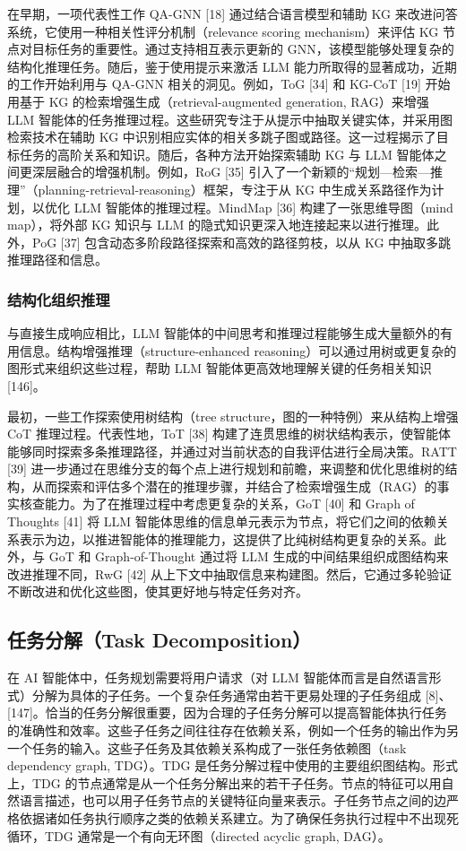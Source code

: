 \documentclass[10pt,UTF8,fontset=fandol]{ctexart}
\begin{document}
在早期，一项代表性工作 QA-GNN [18] 通过结合语言模型和辅助 KG 来改进问答系统，它使用一种相关性评分机制（relevance scoring mechanism）来评估 KG 节点对目标任务的重要性。通过支持相互表示更新的 GNN，该模型能够处理复杂的结构化推理任务。随后，鉴于使用提示来激活 LLM 能力所取得的显著成功，近期的工作开始利用与 QA-GNN 相关的洞见。例如，ToG [34] 和 KG-CoT [19] 开始用基于 KG 的检索增强生成（retrieval-augmented generation, RAG）来增强 LLM 智能体的任务推理过程。这些研究专注于从提示中抽取关键实体，并采用图检索技术在辅助 KG 中识别相应实体的相关多跳子图或路径。这一过程揭示了目标任务的高阶关系和知识。随后，各种方法开始探索辅助 KG 与 LLM 智能体之间更深层融合的增强机制。例如，RoG [35] 引入了一个新颖的“规划—检索—推理”（planning-retrieval-reasoning）框架，专注于从 KG 中生成关系路径作为计划，以优化 LLM 智能体的推理过程。MindMap [36] 构建了一张思维导图（mind map），将外部 KG 知识与 LLM 的隐式知识更深入地连接起来以进行推理。此外，PoG [37] 包含动态多阶段路径探索和高效的路径剪枝，以从 KG 中抽取多跳推理路径和信息。

\subsubsection{结构化组织推理}
与直接生成响应相比，LLM 智能体的中间思考和推理过程能够生成大量额外的有用信息。结构增强推理（structure-enhanced reasoning）可以通过用树或更复杂的图形式来组织这些过程，帮助 LLM 智能体更高效地理解关键的任务相关知识 [146]。

最初，一些工作探索使用树结构（tree structure，图的一种特例）来从结构上增强 CoT 推理过程。代表性地，ToT [38] 构建了连贯思维的树状结构表示，使智能体能够同时探索多条推理路径，并通过对当前状态的自我评估进行全局决策。RATT [39] 进一步通过在思维分支的每个点上进行规划和前瞻，来调整和优化思维树的结构，从而探索和评估多个潜在的推理步骤，并结合了检索增强生成（RAG）的事实核查能力。为了在推理过程中考虑更复杂的关系，GoT [40] 和 Graph of Thoughts [41] 将 LLM 智能体思维的信息单元表示为节点，将它们之间的依赖关系表示为边，以推进智能体的推理能力，这提供了比纯树结构更复杂的关系。此外，与 GoT 和 Graph-of-Thought 通过将 LLM 生成的中间结果组织成图结构来改进推理不同，RwG [42] 从上下文中抽取信息来构建图。然后，它通过多轮验证不断改进和优化这些图，使其更好地与特定任务对齐。

\subsection{任务分解（Task Decomposition）}

在 AI 智能体中，任务规划需要将用户请求（对 LLM 智能体而言是自然语言形式）分解为具体的子任务。一个复杂任务通常由若干更易处理的子任务组成 [8]、[147]。恰当的任务分解很重要，因为合理的子任务分解可以提高智能体执行任务的准确性和效率。这些子任务之间往往存在依赖关系，例如一个任务的输出作为另一个任务的输入。这些子任务及其依赖关系构成了一张任务依赖图（task dependency graph, TDG）。TDG 是任务分解过程中使用的主要组织图结构。形式上，TDG 的节点通常是从一个任务分解出来的若干子任务。节点的特征可以用自然语言描述，也可以用子任务节点的关键特征向量来表示。子任务节点之间的边严格依据诸如任务执行顺序之类的依赖关系建立。为了确保任务执行过程中不出现死循环，TDG 通常是一个有向无环图（directed acyclic graph, DAG）。
\end{document}
